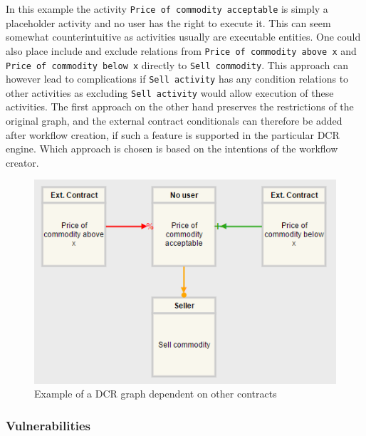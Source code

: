 \documentclass{article}
\begin{document}
			In this example the activity \texttt{Price of commodity acceptable} is simply a placeholder activity and no user has the right to execute it.
			This can seem somewhat counterintuitive as activities usually are executable entities. 
			One could also place include and exclude relations from \texttt{Price of commodity above x} and \texttt{Price of commodity below x} directly to \texttt{Sell commodity}.
			This approach can however lead to complications if \texttt{Sell activity} has any condition relations to other activities as excluding \texttt{Sell activity} would allow execution of these activities.
			The first approach on the other hand preserves the restrictions of the original graph, and the external contract conditionals can therefore be added after workflow creation, if such a feature is supported in the particular DCR engine.
			Which approach is chosen is based on the intentions of the workflow creator.

			\begin{figure}[!ht]
				\centering
				\includegraphics[scale=0.7]{figures/external-contract-conditionals.png}
			 	\caption[External contract conditionals]
			 	{Example of a DCR graph dependent on other contracts}
			 	\label{fig:external-contract-conditionals}
			\end{figure}

			\subsubsection{Vulnerabilities}
\end{document}
